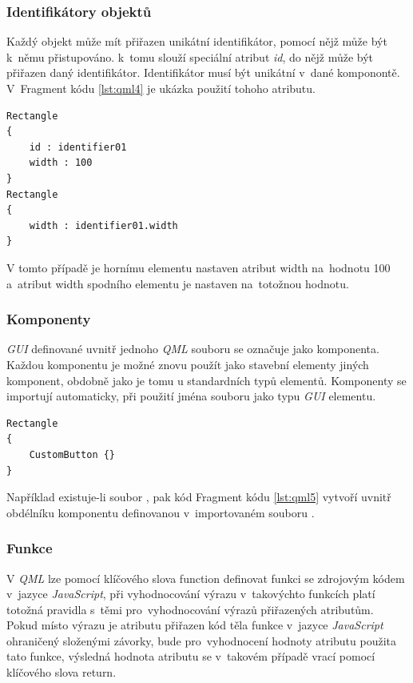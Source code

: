 \documentclass[11pt,twoside,a4paper]{book}
\begin{document}
\subsubsection{Identifikátory objektů}
Každý objekt může mít přiřazen unikátní identifikátor, pomocí nějž může být k~němu přistupováno.  k~tomu slouží speciální atribut \textit{id}, do nějž může být přiřazen daný identifikátor. Identifikátor musí být unikátní v~dané komponontě. V~Fragment kódu \ref{lst:qml4} je ukázka použití tohoho atributu.
\begin{lstlisting}[frame=single,caption=Ukázka použití atributu id.,label=lst:qml4]
Rectangle
{
	id : identifier01
	width : 100
}
Rectangle
{
	width : identifier01.width
}
\end{lstlisting}
V tomto případě je hornímu elementu nastaven atribut width na~hodnotu 100 a~atribut width spodního elementu je nastaven na~totožnou hodnotu.

\subsubsection{Komponenty}
\textit{GUI} definované uvnitř jednoho \textit{QML} souboru se označuje jako komponenta. Každou komponentu je možné znovu použít jako stavební elementy jiných komponent, obdobně jako je tomu u standardních typů elementů. Komponenty se importují automaticky, při použití jména souboru jako typu \textit{GUI} elementu.

\begin{lstlisting}[frame=single,caption=Ukázka použití komponenty z jiného souboru.,label=lst:qml5]
Rectangle
{
	CustomButton {}
}
\end{lstlisting}
Například existuje-li soubor , pak kód Fragment kódu \ref{lst:qml5} vytvoří uvnitř obdélníku komponentu definovanou v~importovaném souboru .

\subsubsection{Funkce}

V \textit{QML} lze pomocí klíčového slova function definovat funkci se zdrojovým kódem v~jazyce \textit{JavaScript}, při vyhodnocování výrazu v~takovýchto funkcích platí totožná pravidla s~těmi pro~vyhodnocování výrazů přiřazených atributům.\\
Pokud místo výrazu je atributu přiřazen kód těla funkce v~jazyce \textit{JavaScript} ohraničený složenými závorky, bude pro~vyhodnocení hodnoty atributu použita tato funkce, výsledná hodnota atributu se v~takovém případě vrací pomocí klíčového slova return.
\end{document}
